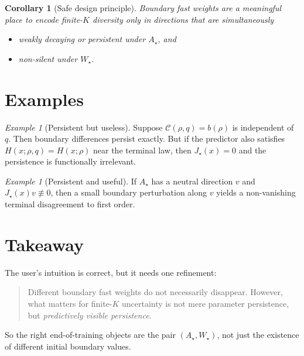 \documentclass[11pt]{article}
\newtheorem{corollary}[theorem]{Corollary}
\theoremstyle{remark}
\newtheorem{example}[theorem]{Example}
\begin{document}
\begin{corollary}[Safe design principle]
\label{cor:safe-principle}
Boundary fast weights are a meaningful place to encode finite-$K$ diversity only in directions that are simultaneously
\begin{itemize}
\item weakly decaying or persistent under $A_\star$, and
\item non-silent under $W_\star$.
\end{itemize}
\end{corollary}

\section{Examples}

\begin{example}[Persistent but useless]
Suppose $\mathcal C(\rho,q)=b(\rho)$ is independent of $q$. Then boundary differences persist exactly. But if the predictor also satisfies $H(x;\rho,q)=H(x;\rho)$ near the terminal law, then $J_\star(x)=0$ and the persistence is functionally irrelevant.
\end{example}

\begin{example}[Persistent and useful]
If $A_\star$ has a neutral direction $v$ and $J_\star(x)v\not\equiv 0$, then a small boundary perturbation along $v$ yields a non-vanishing terminal disagreement to first order.
\end{example}

\section{Takeaway}

The user's intuition is correct, but it needs one refinement:
\begin{quote}
Different boundary fast weights do not necessarily disappear. However, what matters for finite-$K$ uncertainty is not mere parameter persistence, but \emph{predictively visible persistence}.
\end{quote}

So the right end-of-training objects are the pair $(A_\star,W_\star)$, not just the existence of different initial boundary values.
\end{document}
